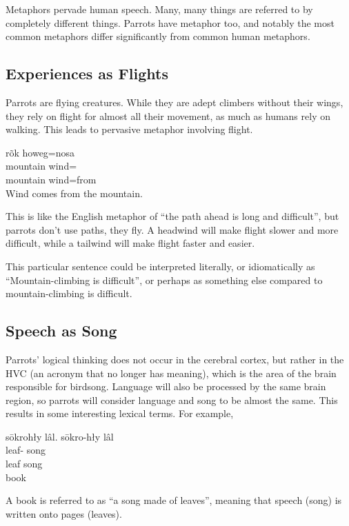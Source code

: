 Metaphors pervade human speech.
Many, many things are referred to by completely different things.
Parrots have metaphor too, and notably the most common metaphors
differ significantly from common human metaphors.

\subsection{Experiences as Flights}\label{subsec:experiences-as-flights}

Parrots are flying creatures.
While they are adept climbers without their wings,
they rely on flight for almost all their movement,
as much as humans rely on walking.
This leads to pervasive metaphor involving flight.

\begin{exe}
    \ex
    \glll
    rõk howeg=nosa \\
    mountain wind=\AblThree \\
    mountain wind=from \\
    \glt
    Wind comes from the mountain.
\end{exe}

This is like the English metaphor of ``the path ahead is long and difficult'',
but parrots don't use paths, they fly.
A headwind will make flight slower and more difficult,
while a tailwind will make flight faster and easier.

This particular sentence could be interpreted literally,
or idiomatically as ``Mountain-climbing is difficult'',
or perhaps as something else compared to mountain-climbing is difficult.

\subsection{Speech as Song}\label{subsec:speech-as-song}

Parrots' logical thinking does not occur in the cerebral cortex,
but rather in the HVC (an acronym that no longer has meaning),
which is the area of the brain responsible for birdsong.
Language will also be processed by the same brain region,
so parrots will consider language and song to be almost the same.
This results in some interesting lexical terms.
For example,

\begin{exe}
    \ex
    \glt
    sōkrohły lâl.
    \glll
    sōkro-hły lâl \\
    leaf-\Adj{} song \\
    leaf song \\
    \glt
    book
\end{exe}
A book is referred to as ``a song made of leaves'',
meaning that speech (song) is written onto pages (leaves).

